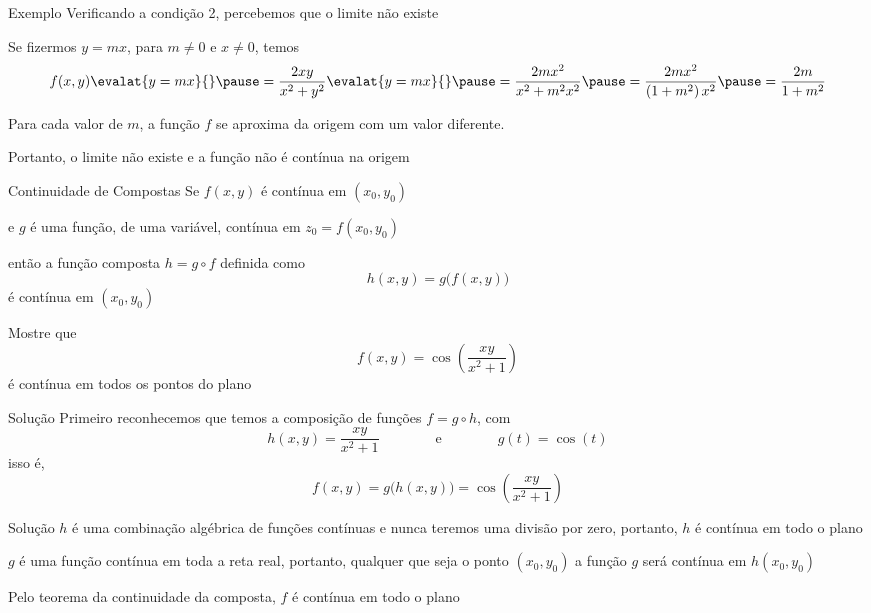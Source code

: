 \begin{frame}{Exemplo \theexemplo}
  Verificando a condição 2, percebemos que o limite não existe

  \pause
  Se fizermos \(y=mx\),
  \pause
  para \(m\neq 0\) e \(x\neq 0\), temos
  \pause
  \[
    f(x, y)\evalat{y=mx}{}
    \pause
    = \frac{2xy}{x^2+y^2}\evalat{y=mx}{}
    \pause
    = \frac{2mx^2}{x^2+m^2x^2}
    \pause
    = \frac{2mx^2}{\left(1+m^2\right)x^2}
    \pause
    = \frac{2m}{1+m^2}
  \]

  \pause
  Para cada valor de $m$, a função $f$ se aproxima da origem com um valor diferente.

  \pause
  Portanto, o limite não existe e a função não é contínua na origem
\end{frame}

\begin{frame}{Continuidade de Compostas}
  Se $f(x, y)$ é contínua em $(x_0, y_0)$

  \pause
  e $g$ é uma função, de uma variável, contínua em $z_0 = f(x_0, y_0)$

  \pause
  então a função composta
  \(
    h = g\circ f
  \)
  \pause
  definida como
  \[
    h(x, y) = g\big(f(x, y)\big)
  \]
  \pause
  é contínua em $(x_0, y_0)$
\end{frame}

\begin{question}
  Mostre que
  \[
    f(x, y) = \cos\left(\frac{xy}{x^2+1}\right)
  \]
  é contínua em todos os pontos do plano
\end{question}

\begin{resolution}{Solução}
  Primeiro reconhecemos que temos a composição de funções $f=g\circ h$,
  \pause
  com
  \[
    h(x, y) = \frac{xy}{x^2+1}
    \qquad\qquad\text{e}\qquad\qquad
    g(t) = \cos(t)
  \]
  \pause
  isso é,
  \[
    f(x, y) = g\big(h(x, y)\big) = \cos\left(\frac{xy}{x^2+1}\right)
  \]
\end{resolution}

\begin{resolution}{Solução}
  $h$ é uma combinação algébrica de funções contínuas e nunca teremos
  uma divisão por zero, portanto, $h$ é contínua em todo o plano

  \pause
  \vspace{\baselineskip}
  $g$ é uma função contínua em toda a reta real, portanto, qualquer que seja o ponto
  $(x_0, y_0)$ a função $g$ será contínua em $h(x_0, y_0  )$

  \pause
  \vspace{\baselineskip}
  Pelo teorema da continuidade da composta, $f$ é contínua em todo o plano
\end{resolution}

